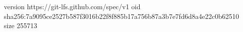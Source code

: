 version https://git-lfs.github.com/spec/v1
oid sha256:7a9095ce2527b587f3016b22f8f885b17a756b87a3b7e7fd6d8a4e22c0b62510
size 255713
